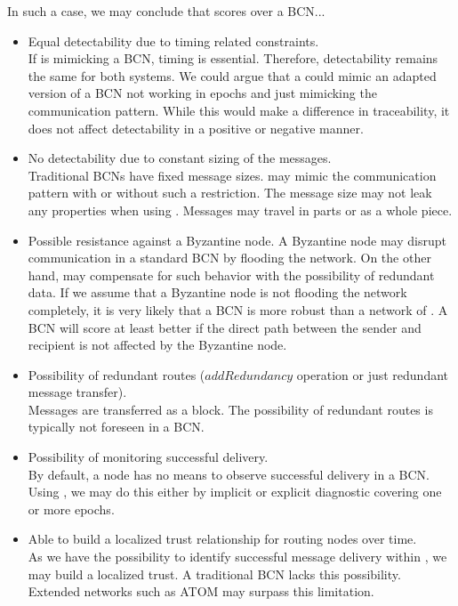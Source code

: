 In such a case, we may conclude that \MessageVortex{} scores over a BCN...
\begin{itemize}
	\item Equal detectability due to timing related constraints.\\
	      If \MessageVortex{} is mimicking a BCN, timing is essential. Therefore, detectability remains the same for both systems. We could argue that a \MessageVortex{} could mimic an adapted version of a BCN not working in epochs and just mimicking the communication pattern. While this would make a difference in traceability, it does not affect detectability in a positive or negative manner.
	\item No detectability due to constant sizing of the messages.\\
	      Traditional BCNs have fixed message sizes. \MessageVortex{} may mimic the communication pattern with or without such a restriction. The message size may not leak any properties when using \MessageVortex{}. Messages may travel in parts or as a whole piece.
	\item Possible resistance against a Byzantine node.
	      A Byzantine node may disrupt communication in a standard BCN by flooding the network. On the other hand, \MessageVortex{} may compensate for such behavior with the possibility of redundant data. If we assume that a Byzantine node is not flooding the network completely, it is very likely that a BCN is more robust than a network of \VortexNodes{}. A BCN will score at least better if the direct path between the sender and recipient is not affected by the Byzantine node. 
	\item Possibility of redundant routes ($addRedundancy$ operation or just redundant message transfer).\\
	      Messages are transferred as a block. The possibility of redundant routes is typically not foreseen in a BCN.
	\item Possibility of monitoring successful delivery.\\
          By default, a node has no means to observe successful delivery in a BCN. Using \MessageVortex{}, we may do this either by implicit or explicit diagnostic covering one or more epochs.
	\item Able to build a localized trust relationship for routing nodes over time.\\
	      As we have the possibility to identify successful message delivery within \MessageVortex{}, we may build a localized trust. A traditional BCN lacks this possibility. Extended networks such as ATOM may surpass this limitation.
\end{itemize}

